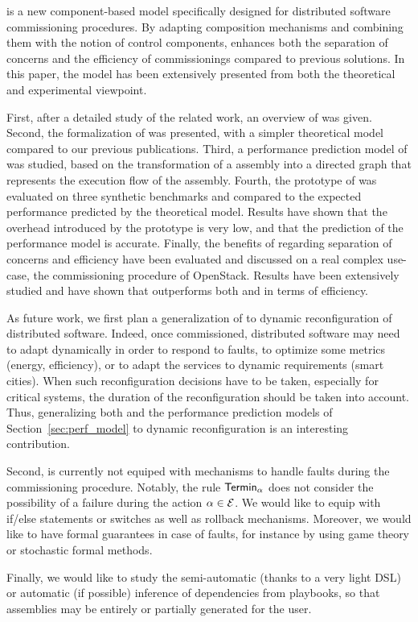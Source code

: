 \mad is a new component-based model specifically designed for
distributed software commissioning procedures. By adapting composition
mechanisms and combining them with the notion of control components, \mad
enhances both the separation of concerns and the efficiency of
commissionings compared to previous solutions. In this paper, the \mad
model has been extensively presented from both the theoretical and
experimental viewpoint.

First, after a detailed study of the related work, an overview of \mad
was given. Second, the formalization of \mad was presented, with a
simpler theoretical model compared to our previous
publications. Third, a performance prediction model of \mad was
studied, based on the transformation of a \mad assembly into a
directed graph that represents the execution flow of the
assembly. Fourth, the prototype of \mad was evaluated on three
synthetic benchmarks and compared to the expected performance
predicted by the theoretical model. Results have shown that the
overhead introduced by the prototype is very low, and that the prediction
of the performance model is accurate. Finally, the benefits of \mad regarding
separation of concerns and efficiency have been evaluated and
discussed on a real complex use-case, the commissioning procedure of
OpenStack. Results have been extensively studied and have shown that
\mad outperforms both \ansible and \aeolus in terms of efficiency.

As future work, we first plan a generalization of \mad to dynamic
reconfiguration of distributed software. Indeed, once commissioned,
distributed software may need to adapt dynamically in order to respond
to faults, to optimize some metrics (\eg energy, efficiency), or to
adapt the services to dynamic requirements (\eg smart cities). When
such reconfiguration decisions have to be taken, especially for
critical systems, the duration of the reconfiguration should be taken
into account. Thus, generalizing both \mad and the performance
prediction models of Section~\ref{sec:perf_model} to dynamic
reconfiguration is an interesting contribution.

Second, \mad is currently not equiped with mechanisms to handle faults
during the commissioning procedure. Notably, the rule $\mathsf{Termin}_\alpha$
does not consider the possibility of a failure during the action
$\alpha \in \mathcal{E}$. We would like to equip \mad with if/else
statements or switches as well as rollback mechanisms. Moreover, we
would like to have formal guarantees in case of faults, for instance
by using game theory or stochastic formal methods.

Finally, we would like to study the semi-automatic (thanks to a very
light DSL) or automatic (if possible) inference of dependencies from
\ansible playbooks, so that \mad assemblies may be entirely or
partially generated for the user.

  
